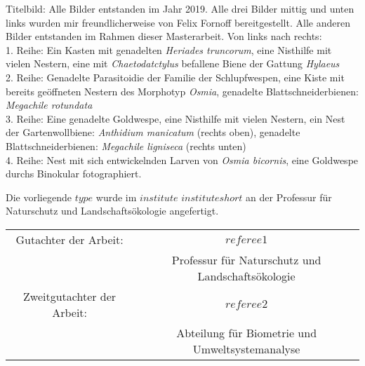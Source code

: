 \documentclass[a4paper,11pt]{article}
\newcommand{\thesistype}{$type$}
\begin{document}
	\begin{scriptsize}
		Titelbild: Alle Bilder entstanden im Jahr 2019. Alle drei Bilder mittig und unten links wurden mir freundlicherweise von Felix Fornoff bereitgestellt. Alle anderen Bilder entstanden im Rahmen dieser Masterarbeit. Von links nach rechts:\\
		1. Reihe: Ein Kasten mit genadelten \textit{Heriades truncorum}, eine Nisthilfe mit vielen Nestern, eine mit \textit{Chaetodatctylus} befallene Biene der Gattung \textit{Hylaeus}\\
		2. Reihe: Genadelte Parasitoidie der Familie der Schlupfwespen, eine Kiste mit bereits geöffneten Nestern des Morphotyp \textit{Osmia}, genadelte Blattschneiderbienen: \textit{Megachile rotundata}\\
		3. Reihe: Eine genadelte Goldwespe, eine Nisthilfe mit vielen Nestern, ein Nest der Gartenwollbiene: \textit{Anthidium manicatum} (rechts oben), genadelte Blattschneiderbienen: \textit{Megachile ligniseca} (rechts unten)\\
		4. Reihe: Nest mit sich entwickelnden Larven von \textit{Osmia bicornis}, eine Goldwespe durchs Binokular fotographiert.\\
	\end{scriptsize}
	
	
	\vspace*{\fill}
	
	
	Die vorliegende \thesistype{} wurde im $institute$ $instituteshort$ an der Professur für Naturschutz und Landschaftsökologie angefertigt. 
	
	
	
	
	\vspace{3cm}
	
	\begin{tabular}{ c c }
		Gutachter der Arbeit:       &  $referee1$ \\
		&  Professur für Naturschutz und Landschaftsökologie    \\
		Zweitgutachter der Arbeit:  &  $referee2$ \\
		&  Abteilung für Biometrie und Umweltsystemanalyse \\
	\end{tabular}
	
	
	
	\newpage
	
	
	\pagebreak
	\thispagestyle{empty}
	\null
	\newpage
	
\end{document}
